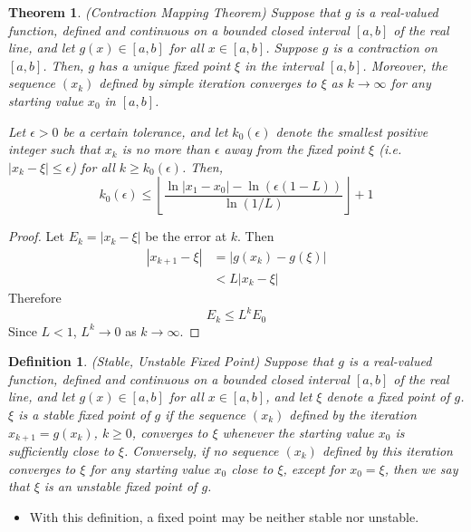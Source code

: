 \documentclass[12pt]{article}
\newtheorem{theorem}{Theorem}
\newtheorem{definition}{Definition}
\theoremstyle{definition}
\begin{document}
\begin{theorem}(Contraction Mapping Theorem)
Suppose that $g$ is a real-valued function, defined and continuous on a bounded closed interval $[a,b]$ of the real line, and let $g(x) \in [a,b]$ for all $x \in [a,b]$. Suppose $g$ is a contraction on $[a,b]$. Then, $g$ has a unique fixed point $\xi$ in the interval $[a,b]$. Moreover, the sequence $(x_k)$ defined by simple iteration converges to $\xi$ as $k \to \infty$ for any starting value $x_0$ in $[a,b]$. 

Let $\epsilon > 0$ be a certain tolerance, and let $k_0 (\epsilon)$ denote the smallest positive integer such that $x_k$ is no more than $\epsilon$ away from the fixed point $\xi$ (i.e. $|x_k - \xi| \leq \epsilon$) for all $k \geq k_0 (\epsilon)$. Then,
\begin{equation}
k_0 (\epsilon) \leq \left\lfloor \frac{\ln|x_1 - x_0| - \ln(\epsilon (1 - L))}{\ln (1 / L)}\right\rfloor + 1
\end{equation}
\end{theorem}

\begin{proof}
Let $E_k = |x_k - \xi|$ be the error at $k$. Then 
\begin{align*}
|x_{k+1} - \xi| &= |g(x_k) - g(\xi)| \\
&< L |x_k - \xi|
\end{align*}
Therefore
\begin{equation}
	E_{k} \leq L^k E_0
\end{equation}
Since $L < 1$, $L^k \to 0$ as $k \to \infty$.
\end{proof}

\begin{definition}(Stable, Unstable Fixed Point)
Suppose that $g$ is a real-valued function, defined and continuous on a bounded closed interval $[a,b]$ of the real line, and let $g(x) \in [a,b]$ for all $x \in [a,b]$, and let $\xi$ denote a fixed point of $g$. $\xi$ is a stable fixed point of $g$ if the sequence $(x_k)$ defined by the iteration $x_{k+1} = g(x_k)$, $k\geq 0$, converges to $\xi$ whenever the starting value $x_0$ is sufficiently close to $\xi$. Conversely, if no sequence $(x_k)$ defined by this iteration converges to $\xi$ for any starting value $x_0$ close to $\xi$, except for $x_0 = \xi$, then we say that $\xi$ is an unstable fixed point of $g$. 
\end{definition}
\begin{itemize}
\item With this definition, a fixed point may be neither stable nor unstable.
\end{itemize}
\end{document}
